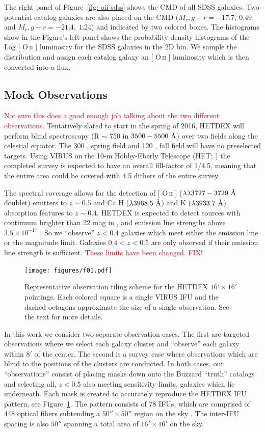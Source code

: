 \documentclass[fleqn,usenatbib]{mnras}
\makeatletter
\newcommand{\editorial}[1]{\textcolor{red}{#1}}
\DeclareRobustCommand{\ion}[2]{%
\relax\ifmmode
\ifx\testbx\f@series
{\mathbf{#1\,\mathsc{#2}}}\else
{\mathrm{#1\,\mathsc{#2}}}\fi
\else\textup{#1\,{\mdseries\textsc{#2}}}%
\fi}
\makeatother
\begin{document}
The right panel of Figure~\ref{fig: oii sdss} shows the CMD of all SDSS galaxies. Two potential catalog galaxies are also placed on the CMD ($M_r, g-r = -17.7,~0.49$ and $M_r, g-r = -21.4,~1.24$) and indicated by two colored boxes. The histograms show in the Figure's left panel shows the probability density histograms of the Log [\ion{O}{ii}] luminosity for the SDSS galaxies in the 2D bin. We sample the distribution and assign each catalog galaxy an [\ion{O}{ii}] luminosity which is then converted into a flux.

\subsection{Mock Observations}\label{sec: observations}
\editorial{Not sure this does a good enough job talking about the two different observations.}
Tentatively slated to start in the spring of 2016, HETDEX will perform blind spectroscopy (R $\sim$ 750 in $3500 - 5500~\hbox{\AA}$) over two fields along the celestial equator. The 300 \degsq, spring field and 120 \degsq, fall field will have no preselected targets. Using VIRUS on the 10-m Hobby-Eberly Telescope (HET; \citealt{Ramsey1998}) the completed survey is expected to have an overall fill-factor of 1/4.5, meaning that the entire area could be covered with 4.5 dithers of the entire survey. 

The spectral coverage allows for the detection of [\ion{O}{ii}] ($\lambda\lambda 3727-3729~\hbox{\AA}$ doublet) emitters to $z\sim 0.5$ and Ca H ($\lambda 3968.5~\hbox{\AA}$) and K ($\lambda 3933.7~\hbox{\AA}$) absorption features to $z\sim 0.4$. HETDEX is expected to detect sources with continuum brighter than 22 mag in \sdssg, and emission line strengths above $3.5\times10^{-17}$ \ergscm. So we ``observe'' $z<0.4$ galaxies which meet either the emission line or the magnitude limit. Galaxies $0.4<z<0.5$ are only observed if their emission line strength is sufficient. \editorial{These limits have been changed. FIX!}

\begin{figure} 
	\texttt{[image: figures/f01.pdf]} 
	\caption{Representative observation tiling scheme for the HETDEX $16' \times 16'$ pointings. Each colored square is a single VIRUS IFU and the dashed octagons approximate the size of a single observation. See the text for more details.} \label{fig: ifu layout} 
\end{figure}

In this work we consider two separate observation cases. The first are targeted observations where we select each galaxy cluster and ``observe'' each galaxy within $8'$ of the center. The second is a survey case where observations which are blind to the positions of the clusters are conducted. In both cases, our ``observations'' consist of placing masks down onto the Buzzard ``truth'' catalogs and selecting all, $z< 0.5$ also meeting sensitivity limits, galaxies which lie underneath. Each mask is created to accurately reproduce the HETDEX IFU pattern, see Figure~\ref{fig: ifu layout}. The pattern consists of 78 IFUs, which are comprised of 448 optical fibers subtending a $50'' \times 50''$ region on the sky \citep{Kelz2014}. The inter-IFU spacing is also $50''$ spanning a total area of $16'\times 16'$ on the sky. 
\end{document}
